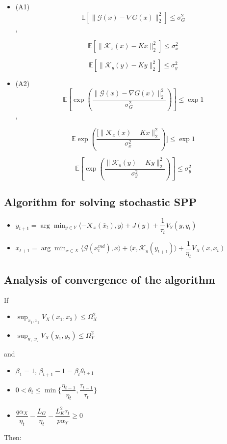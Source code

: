 \documentclass[10pt]{article}
\begin{document}
\begin{itemize}


\item (A1) $$\mathbb{E}[\lVert \mathcal{G}(x) - \nabla G(x) \rVert_{2}^{2}] \leq \sigma_{G}^{2}$$,

$$\mathbb{E}[\lVert \mathcal{K}_{x}(x) - Kx \rVert_{2}^{2}] \leq \sigma_{x}^{2}$$

$$\mathbb{E}[\lVert \mathcal{K}_{y}(y) - Ky \rVert_{2}^{2}] \leq \sigma_{y}^{2}$$

\item (A2) $$\mathbb{E}[\exp(\frac{\lVert \mathcal{G}(x) - \nabla G(x) \rVert_{2}^{2}}{\sigma_{G}^{2}})] \leq \exp{1}$$,

$$\mathbb{E}\exp(\frac{[\lVert \mathcal{K}_{x}(x) - Kx \rVert_{2}^{2}}{\sigma_{x}^{2}})] \leq \exp{1}$$

$$\mathbb{E}[\exp(\dfrac{\lVert \mathcal{K}_{y}(y) - Ky \rVert_{2}^{2}}{\sigma_{y}^{2}})] \leq \sigma_{y}^{2}$$
\end{itemize}

\subsection{Algorithm for solving stochastic SPP}

\begin{itemize}
\item $y_{t+1} = \arg\min_{y \in Y} \langle - \mathcal{K}_{x}(\overline{x}_{t}),y \rangle+ J(y) + \dfrac{1}{\tau_{t}} V_{Y}(y,y_{t})$
\item $x_{t+1} = \arg\min_{x \in X} \langle \mathcal{G}(x_{t}^{md}),x\rangle + \langle x,\mathcal{K}_{y}(y_{t+1}) \rangle + \dfrac{1}{\eta_{t}} V_{X}(x,x_{t})$
\end{itemize}


\subsection{Analysis of convergence of the algorithm}

\begin{thm}

If 

\begin{itemize}
\item $\sup_{x_{1},x_{2}} V_{X}(x_{1},x_{2}) \leq \Omega_{X}^{2}$
\item $\sup_{y_{1},y_{2}} V_{X}(y_{1},y_{2}) \leq \Omega_{Y}^{2}$
\end{itemize}

and

\begin{itemize}
\item $\beta_{1} = 1$, $\beta_{t+1} - 1 = \beta_{t}\theta_{t+1}$
\item $0 < \theta_{t} \leq \min\{ \dfrac{\eta_{t-1}}{\eta_{t}}, \dfrac{\tau_{t-1}}{\tau_{t}}\}$
\item $\dfrac{q\alpha_{X}}{\eta_{t}} - \dfrac{L_{G}}{\eta_{t}} - \dfrac{L_{K}^{2}\tau_{t}}{p\alpha_{Y}} \geq 0$
\end{itemize}

Then:


\end{thm}





\end{document}
